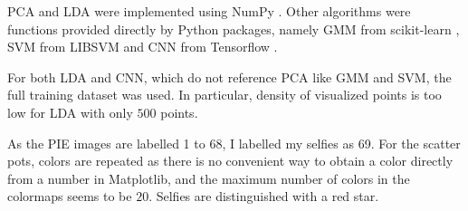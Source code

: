 \documentclass[a4paper]{exam}
\begin{document}
PCA and LDA were implemented using NumPy \cite{2020NumPy-Array}.
Other algorithms were functions provided directly by Python packages,
namely GMM from scikit-learn \cite{scikit-learn}, SVM from LIBSVM \cite{CC01a} and CNN from Tensorflow \cite{Abadi_TensorFlow_Large-scale_machine_2015}.

For both LDA and CNN, which do not reference PCA like GMM and SVM, the full training dataset was used.
In particular, density of visualized points is too low for LDA with only $500$ points.

As the PIE images are labelled 1 to 68, I labelled my selfies as 69.
For the scatter pots, colors are repeated as there is no convenient way to obtain a color directly from a number in Matplotlib,
and the maximum number of colors in the colormaps seems to be $20$. Selfies are distinguished with a red star.
\end{document}
